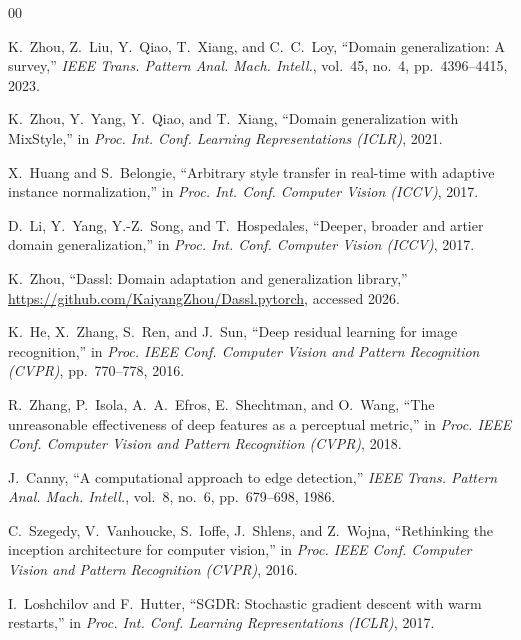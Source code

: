 
\begin{thebibliography}{00}

K.~Zhou, Z.~Liu, Y.~Qiao, T.~Xiang, and C.~C.~Loy,
``Domain generalization: A survey,''
\textit{IEEE Trans. Pattern Anal. Mach. Intell.}, vol.~45, no.~4, pp.~4396--4415, 2023.

K.~Zhou, Y.~Yang, Y.~Qiao, and T.~Xiang,
``Domain generalization with MixStyle,''
in \textit{Proc. Int. Conf. Learning Representations (ICLR)}, 2021.

X.~Huang and S.~Belongie,
``Arbitrary style transfer in real-time with adaptive instance normalization,''
in \textit{Proc. Int. Conf. Computer Vision (ICCV)}, 2017.

D.~Li, Y.~Yang, Y.-Z.~Song, and T.~Hospedales,
``Deeper, broader and artier domain generalization,''
in \textit{Proc. Int. Conf. Computer Vision (ICCV)}, 2017.

K.~Zhou, ``Dassl: Domain adaptation and generalization library,''
\url{https://github.com/KaiyangZhou/Dassl.pytorch}, accessed 2026.

K.~He, X.~Zhang, S.~Ren, and J.~Sun,
``Deep residual learning for image recognition,''
in \textit{Proc. IEEE Conf. Computer Vision and Pattern Recognition (CVPR)}, pp.~770--778, 2016.

R.~Zhang, P.~Isola, A.~A.~Efros, E.~Shechtman, and O.~Wang,
``The unreasonable effectiveness of deep features as a perceptual metric,''
in \textit{Proc. IEEE Conf. Computer Vision and Pattern Recognition (CVPR)}, 2018.

J.~Canny,
``A computational approach to edge detection,''
\textit{IEEE Trans. Pattern Anal. Mach. Intell.}, vol.~8, no.~6, pp.~679--698, 1986.

C.~Szegedy, V.~Vanhoucke, S.~Ioffe, J.~Shlens, and Z.~Wojna,
``Rethinking the inception architecture for computer vision,''
in \textit{Proc. IEEE Conf. Computer Vision and Pattern Recognition (CVPR)}, 2016.

I.~Loshchilov and F.~Hutter,
``{SGDR}: Stochastic gradient descent with warm restarts,''
in \textit{Proc. Int. Conf. Learning Representations (ICLR)}, 2017.

\end{thebibliography}


